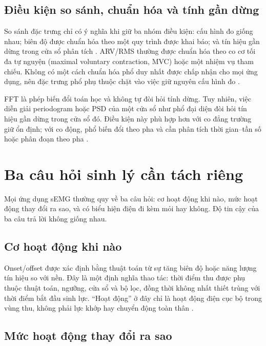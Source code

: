 \subsection{Điều kiện so sánh, chuẩn hóa và tính gần dừng}
\label{sec:stationarity}

So sánh đặc trưng chỉ có ý nghĩa khi giữ ba nhóm điều kiện: cấu hình đo
giống nhau; biên độ được chuẩn hóa theo một quy trình được khai báo; và
tín hiệu gần dừng trong cửa sổ phân tích
\cite{besomi2020consensus,muceli2024tutorial}. ARV/RMS thường được chuẩn
hóa theo co cơ tối đa tự nguyện (maximal voluntary contraction, MVC) hoặc
một nhiệm vụ tham chiếu. Không có một cách chuẩn hóa phổ duy nhất được
chấp nhận cho mọi ứng dụng, nên đặc trưng phổ phụ thuộc chặt vào việc giữ
nguyên cấu hình đo \cite{besomi2020consensus}.

FFT là phép biến đổi toán học và không tự đòi hỏi tính dừng. Tuy nhiên,
việc diễn giải periodogram hoặc PSD của một cửa sổ như phổ đại diện đòi
hỏi tín hiệu gần dừng trong cửa sổ đó. Điều kiện này phù hợp hơn với co
đẳng trường giữ ổn định; với co động, phổ biến đổi theo pha và cần phân
tích thời gian--tần số hoặc phân đoạn theo pha
\cite{knaflitz1999time,muceli2024tutorial,cifrek2009surface}.

\section{Ba câu hỏi sinh lý cần tách riêng}
\label{sec:questions}

Mọi ứng dụng sEMG thường quy về ba câu hỏi: cơ hoạt động khi nào, mức hoạt
động thay đổi ra sao, và có biểu hiện điện đi kèm mỏi hay không. Độ tin cậy
của ba câu trả lời không giống nhau.

\subsection{Cơ hoạt động khi nào}
\label{sec:question-onset}

Onset/offset được xác định bằng thuật toán từ sự tăng biên độ hoặc năng
lượng tín hiệu so với nền. Đây là một định nghĩa thao tác: thời điểm thu
được phụ thuộc thuật toán, ngưỡng, cửa sổ và bộ lọc, đồng thời không nhất
thiết trùng với thời điểm bắt đầu sinh lực. “Hoạt động” ở đây chỉ là hoạt
động điện cục bộ trong vùng thu, không phải lực khớp hay chuyển động toàn
thân \cite{mcmanus2020analysis,boyer2023reducing}.

\subsection{Mức hoạt động thay đổi ra sao}
\label{sec:question-amplitude}

